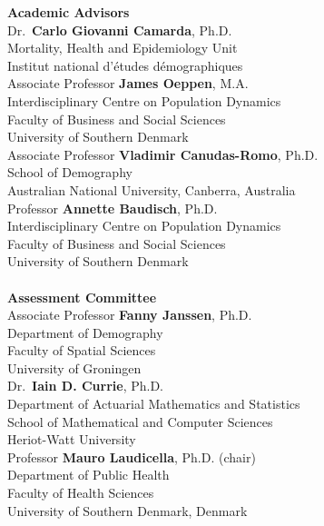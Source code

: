 \documentclass[Thesis]{subfiles}
\begin{document}
\thispagestyle{empty}
\normalsize 
\singlespacing 
\noindent \textbf{\Large Academic Advisors}
\vspace{0.5cm}\\
Dr.~\textbf{Carlo Giovanni Camarda}, Ph.D.\\
Mortality, Health and Epidemiology Unit\\
Institut national d'\'{e}tudes d\'emographiques
\vspace{0.4cm}\\
Associate Professor \textbf{James Oeppen}, M.A.\\
Interdisciplinary Centre on Population Dynamics\\
Faculty of Business and Social Sciences\\
University of Southern Denmark
\vspace{0.4cm}\\
Associate Professor \textbf{Vladimir Canudas-Romo}, Ph.D.\\
School of Demography\\
Australian National University, Canberra, Australia
\vspace{0.4cm}\\
Professor \textbf{Annette Baudisch}, Ph.D.\\
Interdisciplinary Centre on Population Dynamics\\
Faculty of Business and Social Sciences\\
University of Southern Denmark\\
\vspace{2.5cm}\\ 
\vfill
\noindent \textbf{\Large Assessment Committee}
\vspace{0.5cm}\\ 
Associate Professor \textbf{Fanny Janssen}, Ph.D.\\
Department of Demography\\
Faculty of Spatial Sciences\\
University of Groningen
\vspace{0.4cm}\\
Dr.~\textbf{Iain D. Currie}, Ph.D.\\
Department of Actuarial Mathematics and Statistics\\
School of Mathematical and Computer Sciences\\
Heriot-Watt University
\vspace{0.4cm}\\
Professor \textbf{Mauro Laudicella}, Ph.D. (chair)\\
Department of Public Health\\
Faculty of Health Sciences\\
University of Southern Denmark, Denmark
\end{document}
